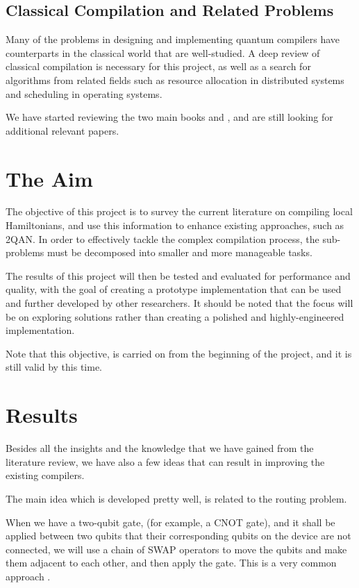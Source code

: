 \documentclass{article}
\begin{document}
\subsection{Classical Compilation and Related Problems}

Many of the problems in designing and implementing quantum compilers have counterparts in the classical world that are well-studied. A deep review of classical compilation is necessary for this project, as well as a search for algorithms from related fields such as resource allocation in distributed systems and scheduling in operating systems.

We have started reviewing the two main books \cite{aho1986} and \cite{allen2001}, and are still looking for additional relevant papers.

\printbibliography[heading=none,keyword=classical]

\section{The Aim}

The objective of this project is to survey the current literature on compiling local Hamiltonians, and use this information to enhance existing approaches, such as 2QAN. In order to effectively tackle the complex compilation process, the sub-problems must be decomposed into smaller and more manageable tasks.

The results of this project will then be tested and evaluated for performance and quality, with the goal of creating a prototype implementation that can be used and further developed by other researchers. It should be noted that the focus will be on exploring solutions rather than creating a polished and highly-engineered implementation.

Note that this objective, is carried on from the beginning of the project, and it is still valid by this time.

\section{Results}

Besides all the insights and the knowledge that we have gained from the literature review, we have also a few ideas that can result in improving the existing compilers.

The main idea which is developed pretty well, is related to the routing problem.

When we have a two-qubit gate, (for example, a CNOT gate), and it shall be applied between two qubits that their corresponding qubits on the device are not connected, we will use a chain of SWAP operators to move the qubits and make them adjacent to each other, and then apply the gate. This is a very common approach \cite{cowtan2019}.
\end{document}
